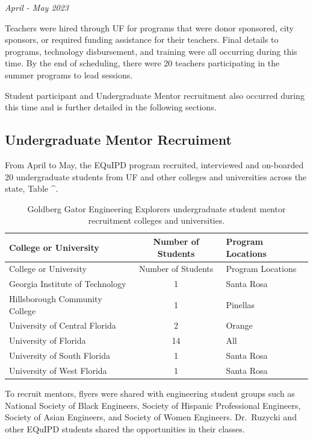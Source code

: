 \documentclass[
]{article}
\begin{document}
\emph{April - May 2023}

Teachers were hired through UF for programs that were donor sponsored,
city sponsors, or required funding assistance for their teachers. Final
details to programs, technology disbursement, and training were all
occurring during this time. By the end of scheduling, there were 20
teachers participating in the summer programs to lead sessions.

Student participant and Undergraduate Mentor recruitment also occurred
during this time and is further detailed in the following sections.

\hypertarget{undergraduate-mentor-recruiment}{%
\subsection{Undergraduate Mentor
Recruiment}\label{undergraduate-mentor-recruiment}}

From April to May, the EQuIPD program recruited, interviewed and
on-boarded 20 undergraduate students from UF and other colleges and
universities across the state, Table \^{}.

\begin{longtable}[]{@{}lcl@{}}
\caption{Goldberg Gator Engineering Explorers undergraduate student
mentor recruitment colleges and universities.}\tabularnewline
\toprule\noalign{}
College or University & Number of Students & Program Locations \\
\midrule\noalign{}
\endfirsthead
\toprule\noalign{}
College or University & Number of Students & Program Locations \\
\midrule\noalign{}
\endhead
\bottomrule\noalign{}
\endlastfoot
Georgia Institute of Technology & 1 & Santa Rosa \\
Hillsborough Community College & 1 & Pinellas \\
University of Central Florida & 2 & Orange \\
University of Florida & 14 & All \\
University of South Florida & 1 & Santa Rosa \\
University of West Florida & 1 & Santa Rosa \\
\end{longtable}

To recruit mentors, flyers were shared with engineering student groups
such as National Society of Black Engineers, Society of Hispanic
Professional Engineers, Society of Asian Engineers, and Society of Women
Engineers. Dr.~Ruzycki and other EQuIPD students shared the
opportunities in their classes.
\end{document}
